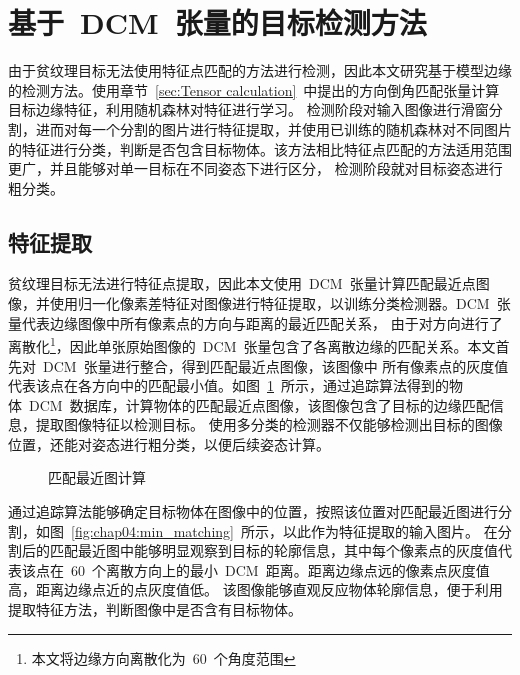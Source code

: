 \section{基于~DCM~张量的目标检测方法}
\label{sec:DCM_object_detect}
由于贫纹理目标无法使用特征点匹配的方法进行检测，因此本文研究基于模型边缘的检测方法。使用章节~\ref{sec:Tensor calculation}~中提出的方向倒角匹配张量计算目标边缘特征，利用随机森林对特征进行学习。
检测阶段对输入图像进行滑窗分割，进而对每一个分割的图片进行特征提取，并使用已训练的随机森林对不同图片的特征进行分类，判断是否包含目标物体。该方法相比特征点匹配的方法适用范围更广，并且能够对单一目标在不同姿态下进行区分，
检测阶段就对目标姿态进行粗分类。

\subsection{特征提取}
\label{sec:NPD}
贫纹理目标无法进行特征点提取，因此本文使用~DCM~张量计算匹配最近点图像，并使用归一化像素差特征对图像进行特征提取，以训练分类检测器。DCM~张量代表边缘图像中所有像素点的方向与距离的最近匹配关系，
由于对方向进行了离散化\footnote{本文将边缘方向离散化为~60~个角度范围}，因此单张原始图像的~DCM~张量包含了各离散边缘的匹配关系。本文首先对~DCM~张量进行整合，得到匹配最近点图像，该图像中
所有像素点的灰度值代表该点在各方向中的匹配最小值。如图~\ref{fig:chap04:matching_min_point}~所示，通过追踪算法得到的物体~DCM~数据库，计算物体的匹配最近点图像，该图像包含了目标的边缘匹配信息，提取图像特征以检测目标。
使用多分类的检测器不仅能够检测出目标的图像位置，还能对姿态进行粗分类，以便后续姿态计算。

\begin{figure}[t] %
  \centering%
  \caption{匹配最近图计算}
  \label{fig:chap04:matching_min_point}
\end{figure}

通过追踪算法能够确定目标物体在图像中的位置，按照该位置对匹配最近图进行分割，如图~\ref{fig:chap04:min_matching}~所示，以此作为特征提取的输入图片。
在分割后的匹配最近图中能够明显观察到目标的轮廓信息，其中每个像素点的灰度值代表该点在~60~个离散方向上的最小~DCM~距离。距离边缘点远的像素点灰度值高，距离边缘点近的点灰度值低。
该图像能够直观反应物体轮廓信息，便于利用提取特征方法，判断图像中是否含有目标物体。

